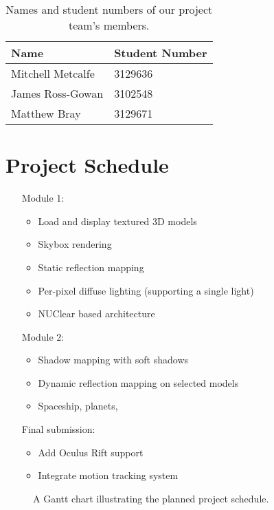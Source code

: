 \documentclass[11pt]{scrartcl} %
\begin{document}
    \begin{table}[h]
    \centering
        \begin{tabular}{@{}ll@{}}
        \toprule
            Name              & Student Number \\
        \midrule
            Mitchell Metcalfe & 3129636        \\
            James Ross-Gowan  & 3102548        \\
            Matthew Bray      & 3129671        \\
        \bottomrule
        \end{tabular}
        \caption[Team members]{Names and student numbers of our project team's members.}
        \label{table:teamMembers}
    \end{table}

\section*{Project Schedule}

    \begin{itemize}
        \item[Module 1:]
            \begin{itemize}
                \item[]
                \item Load and display textured 3D models
                \item Skybox rendering
                \item Static reflection mapping
                \item Per-pixel diffuse lighting (supporting a single light)
                \item NUClear based architecture
            \end{itemize}
        \item[Module 2:]
            \begin{itemize}
                \item[]
                \item Shadow mapping with soft shadows
                \item Dynamic reflection mapping on selected models
                \item Spaceship, planets,
            \end{itemize}
        \item[Final submission:]
            \begin{itemize}
                \item[]
                \item Add Oculus Rift support
                \item Integrate motion tracking system
            \end{itemize}
    \end{itemize}

    \begin{figure}[H]
        \makebox[\textwidth][c]{\resizebox{0.95\paperwidth}{!}{}}
        \caption[Project Schedule]{A Gantt chart illustrating the planned project schedule.}
        \label{gantt:schedule}
    \end{figure}
\end{document}
